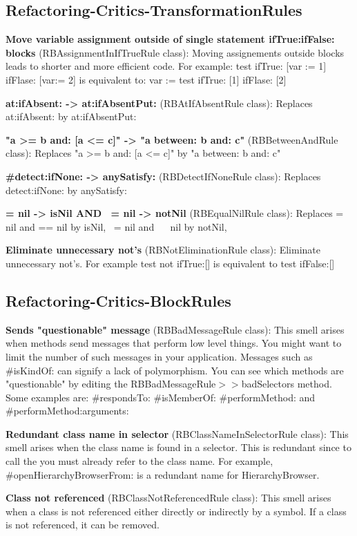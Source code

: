 \subsection{Refactoring-Critics-TransformationRules}
\textbf{Move variable assignment outside of single statement ifTrue:ifFalse: blocks} (RBAssignmentInIfTrueRule class): Moving assignements outside blocks leads to shorter and more efficient code.
For example:
test 
	ifTrue: [var := 1]
	ifFlase: [var:= 2]
is equivalent to:
var :=  test 
	ifTrue: [1]
	ifFlase: [2]

\textbf{at:ifAbsent: -> at:ifAbsentPut:} (RBAtIfAbsentRule class):  Replaces at:ifAbsent: by at:ifAbsentPut:

\textbf{"a >= b and: [a <= c]" -> "a between: b and: c"} (RBBetweenAndRule class):  Replaces "a >= b and: [a <= c]" by "a between: b and: c"

\textbf{#detect:ifNone: -> anySatisfy:} (RBDetectIfNoneRule class): Replaces detect:ifNone: by anySatisfy:

\textbf{= nil -> isNil AND ~= nil -> notNil} (RBEqualNilRule class): Replaces = nil and == nil by isNil, ~= nil and ~~ nil by notNil, 

\textbf{Eliminate unnecessary not's} (RBNotEliminationRule class): Eliminate unnecessary not's.
For example test not ifTrue:[] is equivalent to test ifFalse:[]

\subsection{Refactoring-Critics-BlockRules}
\textbf{Sends "questionable" message} (RBBadMessageRule class): This smell arises when methods send messages that perform low level things. You might want to limit the number of such messages in your application. Messages such as \#isKindOf: can signify a lack of polymorphism. You can see which methods are "questionable" by editing the RBBadMessageRule$>>$badSelectors method. Some examples are: \#respondsTo: \#isMemberOf: \#performMethod: and \#performMethod:arguments:

\textbf{Redundant class name in selector} (RBClassNameInSelectorRule class): This smell arises when the class name is found in a selector. This is redundant since to call the you must already refer to the class name. For example, \#openHierarchyBrowserFrom: is a redundant name for HierarchyBrowser.

\textbf{Class not referenced} (RBClassNotReferencedRule class): This smell arises when a class is not referenced either directly or indirectly by a symbol. If a class is not referenced, it can be removed.

